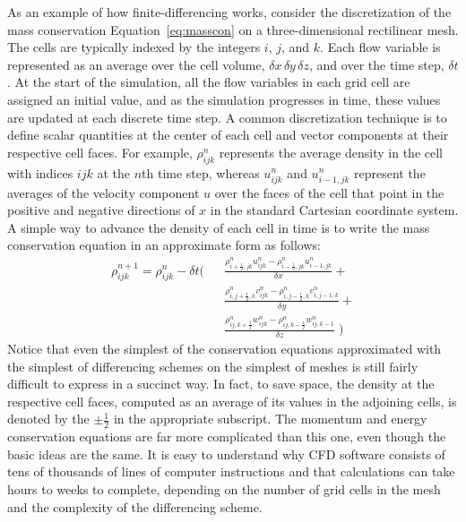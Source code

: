 \documentclass[graybox]{svmult}
\begin{document}
As an example of how finite-differencing works, consider the discretization of the mass conservation Equation~\ref{eq:masscon} on a three-dimensional rectilinear mesh. The cells are typically indexed by the integers $i$, $j$, and $k$. Each flow variable is represented as an average over the cell volume, $\delta x \, \delta y \, \delta z$, and over the time step, $\delta t$. At the start of the simulation, all the flow variables in each grid cell are assigned an initial value, and as the simulation progresses in time, these values are updated at each discrete time step. A common discretization  technique is to define scalar quantities at the center of each cell and vector components at their respective cell faces. For example, $\rho_{ijk}^n$ represents the average density in the cell with indices $ijk$ at the $n$th time step, whereas $u_{ijk}^n$  and $u_{i-1,jk}^n$ represent the averages of the velocity component $u$ over the faces of the cell that point in the positive and negative directions of $x$ in the standard Cartesian coordinate system. A simple way to advance the density of each cell in time is to write the mass conservation equation in an approximate form as follows:
\begin{eqnarray}
\rho_{ijk}^{n+1} = \rho_{ijk}^n  - \delta t \Big( && \frac{ \rho_{i+\frac{1}{2},jk}^n  u_{ijk}^n - \rho_{i-\frac{1}{2},jk}^n  u_{i-1,jk}^n }{\delta x} + \nonumber \\
                                                  && \frac{ \rho_{i,j+\frac{1}{2},k}^n v_{ijk}^n - \rho_{i,j-\frac{1}{2},k}^n v_{i,j-1,k}^n }{\delta y} +  \\
                                                  && \frac{ \rho_{ij,k+\frac{1}{2}}^n  w_{ijk}^n - \rho_{ij,k-\frac{1}{2}}^n  w_{ij,k-1}^n }{\delta z} \; \Big) \nonumber
\label{eq:massdiff}
\end{eqnarray}
Notice that even the simplest of the conservation equations approximated with the simplest of differencing schemes on the simplest of meshes is still fairly difficult to express in a succinct way. In fact, to save space, the density at the respective cell faces, computed as an average of its values in the adjoining cells, is denoted by the $\pm \frac{1}{2}$ in the appropriate subscript. The momentum and energy conservation equations are far more complicated than this one, even though the basic ideas are the same. It is easy to understand why CFD software consists of tens of thousands of lines of computer instructions and that calculations can take hours to weeks to complete, depending on the number of grid cells in the mesh and the complexity of the differencing scheme.
\end{document}
